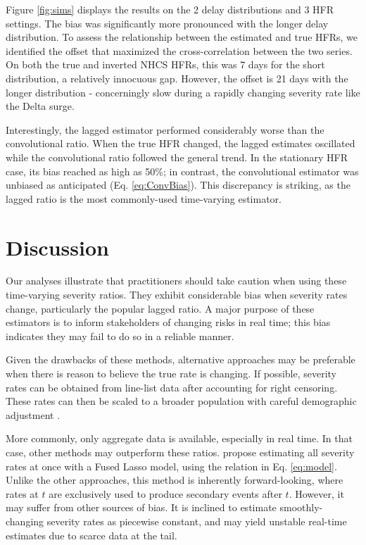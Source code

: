 \documentclass{article}
\begin{document}
Figure \ref{fig:sims} displays the results on the 2 delay distributions and 3 HFR settings. The bias was significantly more pronounced with the longer delay distribution. To assess the relationship between the estimated and true HFRs, we identified the offset that maximized the cross-correlation between the two series. On both the true and inverted NHCS HFRs, this was 7 days for the short distribution, a relatively innocuous gap. However, the offset is 21 days with the longer distribution - concerningly slow during a rapidly changing severity rate like the Delta surge.

Interestingly, the lagged estimator performed considerably worse than the convolutional ratio. When the true HFR changed, the lagged estimates oscillated while the convolutional ratio followed the general trend. In the stationary HFR case, its bias reached as high as 50\%; in contrast, the convolutional estimator was unbiased as anticipated (Eq. \ref{eq:ConvBias}). This discrepancy is striking, as the lagged ratio is the most commonly-used time-varying estimator. 

\section{Discussion}

Our analyses illustrate that practitioners should take caution when using these time-varying severity ratios. They exhibit considerable bias when severity rates change, particularly the popular lagged ratio. A major purpose of these estimators is to inform stakeholders of changing risks in real time; this bias indicates they may fail to do so in a reliable manner.

Given the drawbacks of these methods, alternative approaches may be preferable when there is reason to believe the true rate is changing. If possible, severity rates can be obtained from line-list data after accounting for right censoring. These rates can then be scaled to a broader population with careful demographic adjustment \citep{verity2020estimates}. 

More commonly, only aggregate data is available, especially in real time. In that case, other methods may outperform these ratios. \citet{fusedlasso} propose estimating all severity rates at once with a Fused Lasso model, using the relation in Eq. \ref{eq:model}. Unlike the other approaches, this method is inherently forward-looking, where rates at $t$ are exclusively used to produce secondary events after $t$. However, it may suffer from other sources of bias. It is inclined to estimate smoothly-changing severity rates as piecewise constant, and may yield unstable real-time estimates due to scarce data at the tail.
\end{document}
